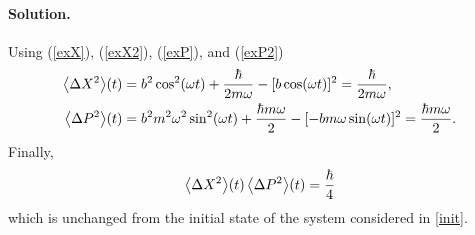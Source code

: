 \documentclass[11pt]{article}
\newcommand{\refeq}[1]{(\ref{#1})}
\newenvironment{solution}
{
    \paragraph{Solution.}
    \ignorespaces
}
{
}
\begin{document}
\begin{solution}
	Using \refeq{exX}, \refeq{exX2}, \refeq{exP}, and \refeq{exP2}
	\begin{align}
		\evDXqt &= b^2 \cosqwt + \frac{\hbar}{2 m \omega} - [b \coswt]^2 = \frac{\hbar}{2 m \omega}, \\
		\evDPqt &= b^2 m^2 \omega^2 \sinqwt + \frac{\hbar m \omega}{2} - [-b m \omega \sinwt]^2 = \frac{\hbar m \omega}{2}.
	\end{align}
	Finally,
	\begin{equation}
		\evDXqt \evDPqt = \frac{\hbar}{4}
	\end{equation}
	which is unchanged from the initial state of the system considered in \ref{init}.

\end{solution}
\end{document}
